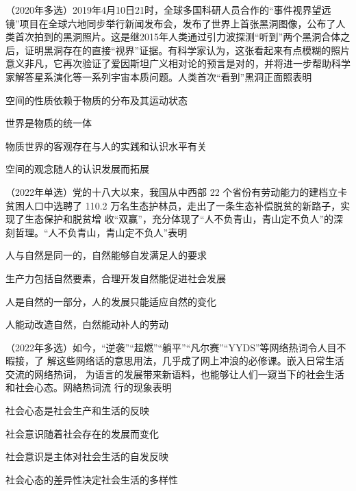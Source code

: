 \documentclass[lang=cn,blue,10pt,scheme=chinese,twocol]{zznote}
\begin{document}
\begin{example} （2020年多选）2019年4月10日21时，全球多国科研人员合作的“事件视界望远镜”项目在全球六地同步举行新闻发布会，发布了世界上首张黑洞图像，公布了人类首次拍到的黑洞照片。这是继2015年人类通过引力波探测“听到”两个黑洞合体之后，证明黑洞存在的直接“视界”证据。有科学家认为，这张看起来有点模糊的照片意义非凡，它再次验证了爱因斯坦广义相对论的预言是对的，并将进一步帮助科学家解答星系演化等一系列宇宙本质问题。人类首次“看到”黑洞正面照表明
	\begin{choice}
		\item 空间的性质依赖于物质的分布及其运动状态
		\item 世界是物质的统一体
		\item 物质世界的客观存在与人的实践和认识水平有关
		\item 空间的观念随人的认识发展而拓展
	\end{choice}
\end{example}


\begin{example}	（2022年单选）党的十八大以来，我国从中西部 22 个省份有劳动能力的建档立卡贫困人口中选聘了
	110.2 万名生态护林员，走出了一条生态补偿脱贫的新路子，实现了生态保护和脱贫增
	收“双赢”，充分体现了“人不负青山，青山定不负人”的深刻哲理。“人不负青山，青山定不负人”表明
	\begin{choice}
		\item 人与自然是同一的，自然能够自发满足人的要求
		\item 生产力包括自然要素，合理开发自然能促进社会发展
		\item 人是自然的一部分，人的发展只能适应自然的变化
		\item 人能动改造自然，白然能动补人的劳动
	\end{choice}
\end{example}


\begin{example}	（2022年多选）如今，“逆袭”“超燃”“躺平”“凡尔赛”“YYDS”等网络热词令人目不暇接，了
	解这些网络话的意思用法，几乎成了网上冲浪的必修课。嵌入日常生活交流的网络热词，
	为语言的发展带来新语料，也能够让人们一窥当下的社会生活和社会心态。网絡热词流
	行的现象表明
	\begin{choice}
		\item 社会心态是社会生产和生活的反映
		\item 社会意识随着社会存在的发展而变化
		\item 社会意识是主体对社会生活的自发反映
		\item 社会心态的差异性决定社会生活的多样性
	\end{choice}
\end{example}
\end{document}
